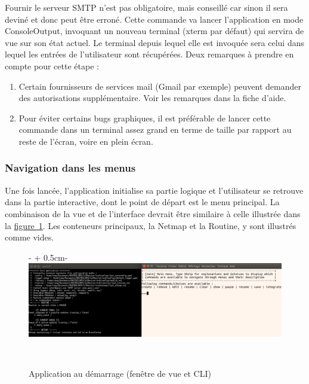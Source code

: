 \documentclass[]{article}
\newcommand{\wordlink}[2]{\hyperref[#1]{#2~\ref{#1}}}
\begin{document}
Fournir le serveur SMTP n'est pas obligatoire, mais conseillé car sinon il sera deviné et donc peut être erroné. Cette commande va lancer l'application en mode ConsoleOutput, invoquant un nouveau terminal (xterm par défaut) qui servira de vue sur son état actuel. Le terminal depuis lequel elle est invoquée sera celui dans lequel les entrées de l'utilisateur sont récupérées. Deux remarques à prendre en compte pour cette étape :

\begin{enumerate}
\item Certain fournisseurs de services mail (Gmail par exemple) peuvent demander des autorisations supplémentaire. Voir les remarques dans la fiche d'aide.
\vspace{0.2cm}
\item Pour éviter certains bugs graphiques, il est préférable de lancer cette commande dans un terminal assez grand en terme de taille par rapport au reste de l'écran, voire en plein écran.
\end{enumerate}

\subsubsection{Navigation dans les menus}

Une fois lancée, l'application initialise sa partie logique et l'utilisateur se retrouve dans la partie interactive, dont le point de départ est le menu principal. La combinaison de la vue et de l'interface devrait être similaire à celle illustrée dans la \wordlink{startapp}{figure}. Les conteneurs principaux, la Netmap et la Routine, y sont illustrés comme vides.

\begin{figure}[!ht]
   \begin{adjustwidth}{-\oddsidemargin-1in + 0.5cm}{-\rightmargin}
     \centering
     \includegraphics[width=\paperwidth - 1cm]{startapp}
     \caption{Application au démarrage (fenêtre de vue et CLI)}
     \label{startapp}
   \end{adjustwidth}
   \
\end{figure}
\end{document}
